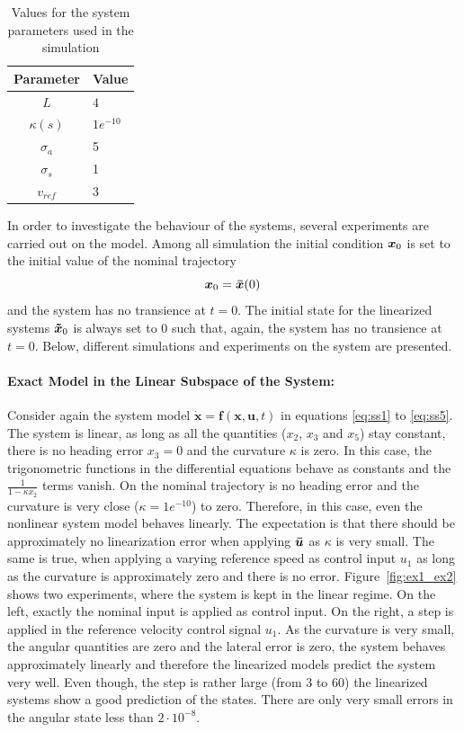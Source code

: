 \begin{table}[h]
	\centering
	\begin{tabular}{c|l}
	\hline
	\hline
	\textbf{Parameter} & \textbf{Value}\\
	\hline
	$L$ & $4$\\
	$\kappa (s)$ & $1e^{-10}$\\
	$\sigma_a$ & 5\\
	$\sigma_s$ & 1\\
	$v_{ref}$ & 3\\
	\hline
	\hline
	\end{tabular}
	\caption{Values for the system parameters used in the simulation}
	\label{tab:simu_param_values}
\end{table}
In order to investigate the behaviour of the systems, several experiments are carried out on the model.
Among all simulation the initial condition $\boldsymbol{x}_0$ is set to the initial value of the nominal trajectory 
\begin{equation}
	\boldsymbol{x}_0 = \boldsymbol{\bar{x}} (0) \, 
\end{equation}
and the system has no transience at $t = 0$. 
The initial state for the linearized systems $\boldsymbol{\tilde{x}}_0$ is always set to $0$ such that, again, the system has no transience at $t=0$.
Below, different simulations and experiments on the system are presented.

\paragraph{Exact Model in the Linear Subspace of the System: }
Consider again the system model $\mathbf{\dot{x}} = \mathbf{f}(\mathbf{x}, \mathbf{u}, t)$ in equations \eqref{eq:ss1} to \eqref{eq:ss5}.
The system is linear, as long as all the quantities ($x_2$, $x_3$ and $x_5$) stay constant, there is no heading error $x_3 = 0$ and the curvature $\kappa$ is zero.
In this case, the trigonometric functions in the differential equations behave as constants and the $\frac{1}{1- \kappa x_2}$ terms vanish.
On the nominal trajectory is no heading error and the curvature is very close ($\kappa = 1e^{-10}$) to zero.
Therefore, in this case, even the nonlinear system model behaves linearly.
The expectation is that there should be approximately no linearization error when applying $\boldsymbol{\bar{u}}$ as $\kappa$ is very small.
The same is true, when applying a varying reference speed as control input $u_1$ as long as the curvature is approximately zero and there is no error.
Figure~\ref{fig:ex1_ex2} shows two experiments, where the system is kept in the linear regime.
On the left, exactly the nominal input is applied as control input.
On the right, a step is applied in the reference velocity control signal $u_1$.
As the curvature is very small, the angular quantities are zero and the lateral error is zero, the system behaves approximately linearly and therefore the linearized models predict the system very well.
Even though, the step is rather large (from $3$ to $60$) the linearized systems show a good prediction of the states.
There are only very small errors in the angular state less than $2\cdot 10^{-8}$.


